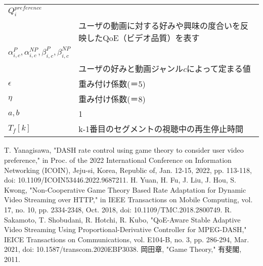 \documentclass[rinkou,a4paper,uplatex]{ieicej}
\begin{document}
\begin{table}[h]
{\begin{minipage}{1.25\textwidth}
\begin{tabularx}{\textwidth}{L{3em}X}
    $Q^{preference}_i$ \\& ユーザの動画に対する好みや興味の度合いを反映したQoE（ビデオ品質）を表す \\
    $\alpha^P_{i,c}, \alpha^{NP}_{i,c}, \beta^P_{i,c}, \beta^{NP}_{i,c}$\\ & ユーザの好みと動画ジャンル$c$によって定まる値 \\
    $\epsilon$ & 重み付け係数(＝5) \\
    $\eta$ & 重み付け係数(＝8) \\
    $a, b$ & 1 \\
    $T_f[k]$ & k-1番目のセグメントの視聴中の再生停止時間 
  \end{tabularx}
\end{minipage} %
} %
\end{table}


\begin{thebibliography}{9} %
 T. Yanagisawa, "DASH rate control using game theory to consider user video preference," in Proc. of the 2022 International Conference on Information Networking (ICOIN), Jeju-si, Korea, Republic of, Jan. 12-15, 2022, pp. 113-118, doi: 10.1109/ICOIN53446.2022.9687211.
H. Yuan, H. Fu, J. Liu, J. Hou, S. Kwong, "Non-Cooperative Game Theory Based Rate Adaptation for Dynamic Video Streaming over HTTP," in IEEE Transactions on Mobile Computing, vol. 17, no. 10, pp. 2334-2348, Oct. 2018, doi: 10.1109/TMC.2018.2800749.
 R. Sakamoto, T. Shobudani, R. Hotchi, R. Kubo, "QoE-Aware Stable Adaptive Video Streaming Using Proportional-Derivative Controller for MPEG-DASH," IEICE Transactions on Communications, vol. E104-B, no. 3, pp. 286-294, Mar. 2021, doi: 10.1587/transcom.2020EBP3038.
 岡田章, "Game Theory," 有斐閣, 2011.
 
\end{thebibliography}
\end{document}
